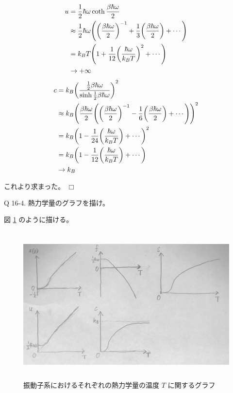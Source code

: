 \documentclass[uplatex,dvipdfmx,a4paper,11pt]{jlreq}
\theoremstyle{definition}
\begin{document}
\begin{align}
  u        & = \frac{1}{2}\hbar\omega\coth\frac{\beta\hbar\omega}{2}                                                                          \\
           & \approx \frac{1}{2}\hbar\omega\qty(\qty(\frac{\beta\hbar\omega}{2})^{-1} + \frac{1}{3}\qty(\frac{\beta\hbar\omega}{2}) + \cdots) \\
           & = k_BT\qty(1 + \frac{1}{12}\qty(\frac{\hbar\omega}{k_BT})^{2} + \cdots)                                                          \\
           & \to +\infty                                                                                                                      \\
\end{align}
\begin{align}
  c & = k_B\qty(\frac{\frac{1}{2}\beta\hbar\omega}{\sinh\frac{1}{2}\beta\hbar\omega})^2                                                               \\
    & \approx k_B\qty(\frac{\beta\hbar\omega}{2}\qty(\qty(\frac{\beta\hbar\omega}{2})^{-1} - \frac{1}{6}\qty(\frac{\beta\hbar\omega}{2}) + \cdots))^2 \\
    & = k_B\qty(1 - \frac{1}{24}\qty(\frac{\hbar\omega}{k_BT}) + \cdots)^2                                                                            \\
    & = k_B\qty(1 - \frac{1}{12}\qty(\frac{\hbar\omega}{k_BT}) + \cdots)                                                                              \\
    & \to k_B
\end{align}

これより求まった。 $\Box$

\begin{itembox}[l]{Q 16-4.}
  熱力学量のグラフを描け。
\end{itembox}

図 \ref{fig:oscillator} のように描ける。

\begin{figure}[htbp]
  \begin{center}
    \includegraphics[height=8cm]{oscillator_system.jpg}
    \caption{振動子系におけるそれぞれの熱力学量の温度 $T$ に関するグラフ}
    \label{fig:oscillator}
  \end{center}
\end{figure}
\end{document}
